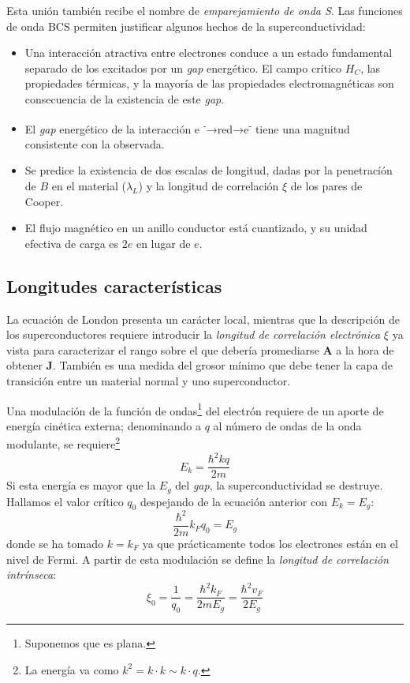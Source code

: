 \documentclass{tufte-book}
\newcommand{\sub}[1]{_{{\scriptscriptstyle\mathit{#1}}}}
\begin{document}
Esta unión también recibe el nombre de \emph{emparejamiento de onda
  S}. Las funciones de onda BCS permiten justificar algunos hechos de
la superconductividad:
\begin{itemize}
\item Una interacción atractiva entre electrones conduce a un estado
  fundamental separado de los excitados por un \textit{gap} energético. El
  campo crítico $H\sub{C}$, las propiedades térmicas, y la mayoría de
  las propiedades electromagnéticas son consecuencia de la existencia
  de este \textit{gap}.
\item El \textit{gap} energético de la interacción e \textsuperscript{-}→red→e\textsuperscript{-}
  tiene una magnitud consistente con la observada.
\item Se predice la existencia de dos escalas de longitud, dadas por
  la penetracíón de $B$ en el material ($λ\sub{L}$) y la longitud de
  correlación $ξ$ de los pares de Cooper.
\item El flujo magnético en un anillo conductor está cuantizado, y su
  unidad efectiva de carga es $2e$ en lugar de $e$.
\end{itemize}

\subsection{Longitudes características}
La ecuación de London presenta un carácter local, mientras que la
descripción de los superconductores requiere introducir la
\emph{longitud de correlación electrónica} $ξ$ ya vista para
caracterizar el rango sobre el que debería promediarse $\symbf{A}$ a
la hora de obtener $\symbf{J}$. También es una medida del grosor
mínimo que debe tener la capa de transición entre un material normal y
uno superconductor.

Una modulación de la función de ondas\footnote{Suponemos que es
  plana.} del electrón requiere de un aporte de energía cinética
externa; denominando a $q$ al número de ondas de la onda modulante, se
requiere\footnote{La energía va como $k^2=k⋅k∼k⋅q$.}
\begin{equation}
  E_k = \frac{ℏ^2kq}{2m}
\end{equation}
Si esta energía es mayor que la $E_g$ del \textit{gap}, la
superconductividad se destruye. Hallamos el valor crítico $q_0$
despejando de la ecuación anterior con $E_k = E_g$:
\begin{equation}
  \frac{ℏ^2}{2m}k\sub{F}q_0 = E_g
\end{equation}
donde se ha tomado $k=k\sub{F}$ ya que prácticamente todos los
electrones están en el nivel de Fermi. A partir de esta modulación se
define la \emph{longitud de correlación intrínseca}:
\begin{equation}
  ξ_0 = \frac{1}{q_0} = \frac{ℏ^2k\sub{F}}{2mE_g} = \frac{ℏ^2v\sub{F}}{2E_g}
\end{equation}
\end{document}
